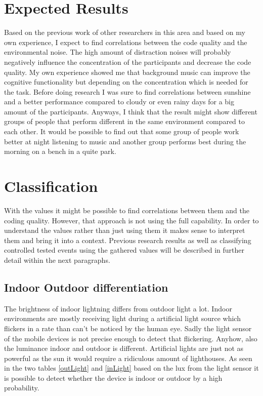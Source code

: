 \section{Expected Results}
Based on the previous work of other researchers in this area and based on my own experience, I expect to find correlations between the code quality and the environmental noise. The high amount of distraction noises will probably negatively influence the concentration of the participants and decrease the code quality. My own experience showed me that background music can improve the cognitive functionality but depending on the concentration which is needed for the task. Before doing research I was sure to find correlations between sunshine and a better performance compared to cloudy or even rainy days for a big amount of the participants. Anyways, I think that the result might show different groups of people that perform different in the same environment compared to each other. It would be possible to find out that some group of people work better at night listening to music and another group performs best during the morning on a bench in a quite park.


\section{Classification}
With the values it might be possible to find correlations between them and the coding quality. However, that approach is not using the full capability. In order to understand the values rather than just using them it makes sense to interpret them and bring it into a context. Previous research results as well as classifying controlled tested events using the gathered values will be described in further detail within the next paragraphs.

\subsection{Indoor Outdoor differentiation}
The brightness of indoor lightning differs from outdoor light a lot. Indoor environments are mostly receiving light during a artificial light source which flickers in a rate than can't be noticed by the human eye. Sadly the light sensor of the mobile devices is not precise enough to detect that flickering. Anyhow, also the luminance indoor and outdoor is different. Artificial lights are just not as powerful as the sun it would require a  ridiculous amount of lighthouses. 
As seen in the two tables \ref{outLight} and \ref{inLight} based on the lux from the light sensor it is possible to detect whether the device is indoor or outdoor by a high probability.


